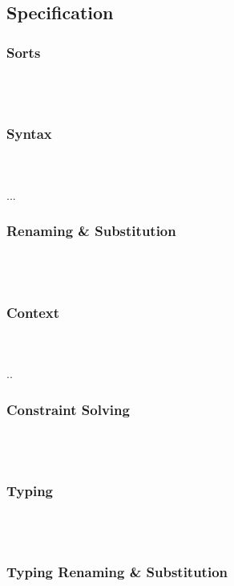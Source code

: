 \subsection{Specification}
\subsubsection{Sorts}\hfill\\\\
\FoSort
\subsubsection{Syntax}\hfill\\\\
\FoTerm
... \FoCstr
\subsubsection{Renaming \& Substitution}\hfill\\\\
\Fosubs
\subsubsection{Context}\hfill\\\\
\Foitem
..
\FoCtx
\subsubsection{Constraint Solving}\hfill\\\\
\FoCstrSolve
\subsubsection{Typing}\hfill\\\\
\Fokind
\FoTyping
\subsubsection{Typing Renaming \& Substitution}\hfill\\\\
\FoRenTyping
\FoSubTyping

